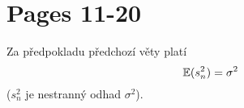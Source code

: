 \chapter{Pages 11-20}

\newcommand{\Var}{\mathrm{Var}}
\newcommand{\hbn}{\widehat{\beta}_0}
\newcommand{\hbj}{\widehat{\beta}_1}
\newcommand{\hbi}{\widehat{\beta}_i}
\newcommand{\lxn}{\overline{x}_n}
\newcommand{\hxn}{\overline{x}_n}
\newcommand{\hYn}{\widehat{Y}_n}
\newcommand{\hYi}{\widehat{Y}_i}
\newcommand{\sxx}{s_{xx}}

\begin{theorem}
	Za předpokladu předchozí věty platí
	\begin{equation*}
		\mathbb{E} (s_n^2) = \sigma^2
	\end{equation*}
	($s_n^2$ je nestranný odhad $\sigma^2$).
\end{theorem}


